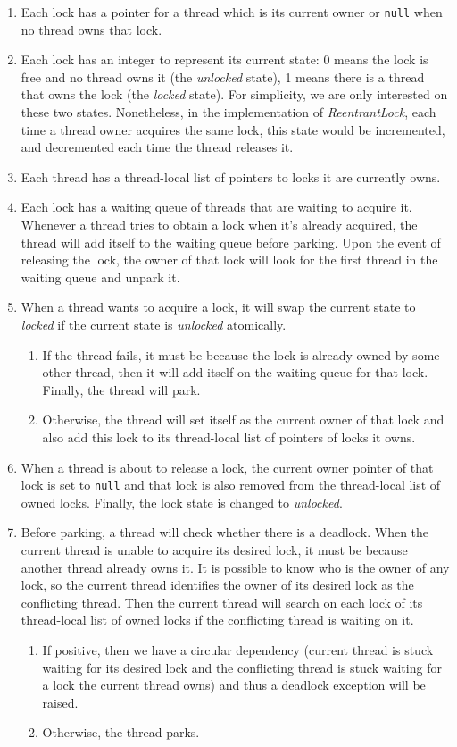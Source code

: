 \begin{enumerate}
\item Each lock has a pointer for a thread which is its current owner or {\tt null} when no thread owns that lock.
\item Each lock has an integer to represent its current state: 0 means the lock is free and no thread owns it (the \emph{unlocked} state), 1 means there is a thread that owns the lock (the \emph{locked} state). For simplicity, we are only interested on these two states. Nonetheless, in the implementation of \emph{ReentrantLock}, each time a thread owner acquires the same lock, this state would be incremented, and decremented each time the thread releases it.
\item Each thread has a thread-local list of pointers to locks it are currently owns.
\item Each lock has a waiting queue of threads that are waiting to acquire it. Whenever a thread tries to obtain a lock when it's already acquired, the thread will add itself to the waiting queue before parking. Upon the event of releasing the lock, the owner of that lock will look for the first thread in the waiting queue and unpark it.
\item When a thread wants to acquire a lock, it will swap the current state to \emph{locked} if the current state is \emph{unlocked} atomically.
\begin{enumerate}
\item If the thread fails, it must be because the lock is already owned by some other thread, then it will add itself on the waiting queue for that lock. Finally, the thread will park.
\item Otherwise, the thread will set itself as the current owner of that lock and also add this lock to its thread-local list of pointers of locks it owns.
\end{enumerate}
\item When a thread is about to release a lock, the current owner pointer of that lock is set to {\tt null} and that lock is also removed from the thread-local list of owned locks. Finally, the lock state is changed to \emph{unlocked}.
\item Before parking, a thread will check whether there is a deadlock. When the current thread is unable to acquire its desired lock, it must be because another thread already owns it. It is possible to know who is the owner of any lock, so the current thread identifies the owner of its desired lock as the conflicting thread. Then the current thread will search on each lock of its thread-local list of owned locks if the conflicting thread is waiting on it.
\begin{enumerate}
\item If positive, then we have a circular dependency (current thread is stuck waiting for its desired lock and the conflicting thread is stuck waiting for a lock the current thread owns) and thus a deadlock exception will be raised.
\item Otherwise, the thread parks.
\end{enumerate}
\end{enumerate}

